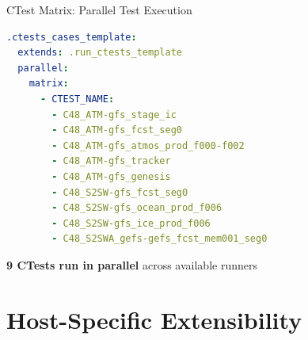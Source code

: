 \documentclass[aspectratio=169]{beamer}
\begin{document}
\begin{frame}[fragile]{CTest Matrix: Parallel Test Execution}

\begin{lstlisting}[language=yaml,basicstyle=\ttfamily\tiny,title={\small CTest Label Matrix -- Each Runs as Separate Job}]
.ctests_cases_template:
  extends: .run_ctests_template
  parallel:
    matrix:
      - CTEST_NAME:
        - C48_ATM-gfs_stage_ic
        - C48_ATM-gfs_fcst_seg0
        - C48_ATM-gfs_atmos_prod_f000-f002
        - C48_ATM-gfs_tracker
        - C48_ATM-gfs_genesis
        - C48_S2SW-gfs_fcst_seg0
        - C48_S2SW-gfs_ocean_prod_f006
        - C48_S2SW-gfs_ice_prod_f006
        - C48_S2SWA_gefs-gefs_fcst_mem001_seg0
\end{lstlisting}

\vspace{0.3cm}
\begin{center}
\end{center}

\begin{center}
\textbf{9 CTests run in parallel} across available runners
\end{center}

\end{frame}

\section{Host-Specific Extensibility}
\end{document}
